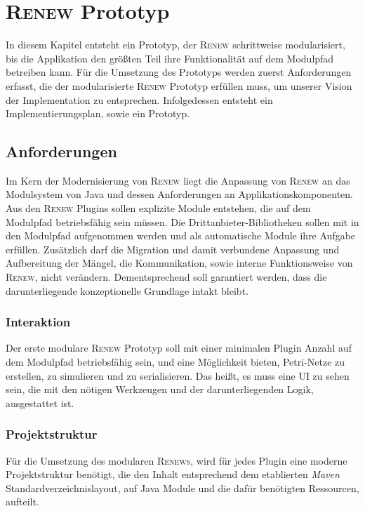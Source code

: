 \chapter{\textsc{Renew} Prototyp} 
	In diesem Kapitel entsteht ein Prototyp, der \textsc{Renew} schrittweise modularisiert, bis die Applikation den größten Teil ihre Funktionalität auf dem Modulpfad betreiben kann. \newline
	Für die Umsetzung des Prototyps werden zuerst Anforderungen erfasst, die der modularisierte \textsc{Renew} Prototyp erfüllen muss, um unserer Vision der Implementation zu entsprechen. Infolgedessen entsteht ein Implementierungsplan, sowie ein Prototyp.

\section{Anforderungen} \label{sec:anforderungen}
	Im Kern der Modernisierung von \textsc{Renew} liegt die Anpassung von \textsc{Renew} an das Modulsystem von Java und dessen Anforderungen an Applikationskomponenten. Aus den \textsc{Renew} Plugins sollen explizite Module entstehen, die auf dem Modulpfad betriebsfähig sein müssen. Die Drittanbieter-Bibliotheken sollen mit in den Modulpfad aufgenommen werden und als automatische Module ihre Aufgabe erfüllen. Zusätzlich darf die Migration und damit verbundene Anpassung und Aufbereitung der Mängel, die Kommunikation, sowie interne Funktionsweise von \textsc{Renew}, nicht verändern. Dementsprechend soll garantiert werden, dass die darunterliegende konzeptionelle Grundlage intakt bleibt.

\subsection{Interaktion}
	Der erste modulare \textsc{Renew} Prototyp soll mit einer minimalen Plugin Anzahl auf dem Modulpfad betriebsfähig sein, und eine Möglichkeit bieten, Petri-Netze zu erstellen, zu simulieren und zu serialisieren. Das heißt, es muss eine UI zu sehen sein, die mit den nötigen Werkzeugen und der darunterliegenden Logik, ausgestattet ist. 

\subsection{Projektstruktur}
	Für die Umsetzung des modularen \textsc{Renews}, wird für jedes Plugin eine moderne Projektstruktur benötigt, die den Inhalt entsprechend dem etablierten \textit{Maven} Standardverzeichnislayout, auf Java Module und die dafür benötigten Ressourcen, aufteilt. 

